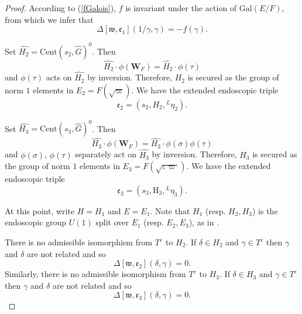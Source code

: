 \documentclass[11pt]{amsart}
\numberwithin{equation}{section}
\def\fe{\mathfrak{e}}
\def\fw{\mathfrak{w}}
\def\Cent{\mathrm{Cent}}
\def\Gal{\mathrm{Gal}}
\def\H{\mathrm{H}}
\def\bW{\mathbf{W}}
\newcommand{\<}{\left\langle}
\renewcommand{\>}{\right\rangle}
\begin{document}
\begin{proof}
According to (\ref{fGalois}), $f$   is invariant under the action of $\Gal(E/F)$, from which we infer that 
\begin{equation*}\label{DeltaFormula}
\Delta[\fw, \fe_1](1/\gamma, \gamma) = - f(\gamma).
\end{equation*}

Set $\widehat{H_2} = \Cent(s_2, \widehat{G})^0$.   Then 
 \[
  \widehat{H_2}\cdot \phi(\bW_F) = \widehat{H_2} \cdot \phi(\tau)
  \]
 and $\phi(\tau)$ acts on $\widehat{H_2}$ by inversion.    Therefore,  $H_2$ is secured as the group of norm $1$ elements in $E_2 = F(\sqrt \varpi)$.   
 We have the extended endoscopic triple
 \[
 \fe_2 = (s_2, H_2, {}^L\eta_2).
 \]

  

Set $\widehat{H_3} = \Cent(s_3, \widehat{G})^0$.   Then 
 \[
  \widehat{H_3}\cdot \phi(\bW_F) = \widehat{H_3} \cdot \phi(\sigma) \phi(\tau)
  \]
 and $\phi(\sigma)$, $\phi(\tau)$ separately act on $\widehat{H_3}$ by inversion.    Therefore,  $H_3$ is secured as the group of norm $1$ elements in $E_3 = F(\sqrt {\varepsilon \varpi})$.   
 We  have the extended endoscopic triple
 \[
 \fe_3 = (s_3, \H_3, {}^L\eta_3).
 \]


At this point, write $H = H_1$ and $E = E_1$.   Note that $H_1$ (resp. $H_2, H_3$) is the endoscopic group $U(1)$ split over $E_1$ (resp. $E_2, E_3$), as in \cite[\S11.1.5]{CFM+}.



There is no admissible isomorphism from $T^\varepsilon$ to $H_2$.   If $\delta \in H_2$ and $\gamma \in T^\varepsilon$ then $\gamma $ and $\delta$ are not related and so 
\[
\Delta[\fw, \fe_2](\delta, \gamma) = 0.   
\]
Similarly, there is no admissible isomorphism from $T^\varepsilon$ to $H_3$.   If $\delta \in H_3$ and $\gamma \in T^\varepsilon$ then $\gamma$ and $\delta$ are not related and so 
\[
\Delta[\fw, \fe_3](\delta, \gamma) = 0.   
\]
\end{proof}
\end{document}
